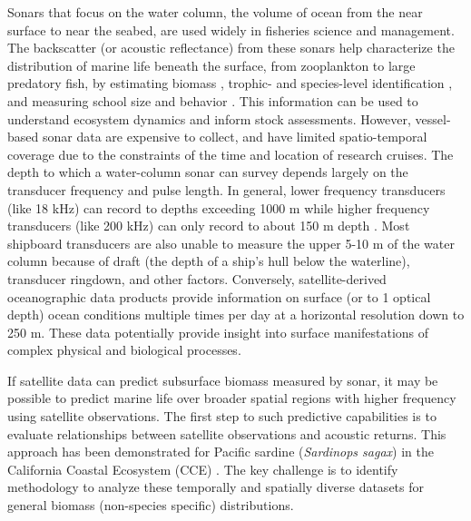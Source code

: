 \documentclass[10pt,letterpaper]{article}
\begin{document}
Sonars that focus on the water column, the volume of ocean from the near surface to near the seabed, are used widely in fisheries science and management. The backscatter (or acoustic reflectance) from these sonars help characterize the distribution of marine life beneath the surface, from zooplankton to large predatory fish, by estimating biomass \cite{davison2015acoustic}, trophic- and species-level identification \cite{benoit2001target} \cite{trenkel2013fisheries}, and measuring school size and behavior \cite{towler2003visualizing} \cite{kaartvedt2009use} \cite{jech2012aggregative}. This information can be used to understand ecosystem dynamics and inform stock assessments. However, vessel-based sonar data are expensive to collect, and have limited spatio-temporal coverage due to the constraints of the time and location of research cruises. The depth to which a water-column sonar can survey depends largely on the transducer frequency and pulse length. In general, lower frequency transducers (like 18 kHz) can record to depths exceeding 1000 m while higher frequency transducers (like 200 kHz) can only record to about 150 m depth \cite{simmonds2008fisheries}. Most shipboard transducers are also unable to measure the upper 5-10 m of the water column because of draft (the depth of a ship's hull below the waterline), transducer ringdown, and other factors. Conversely, satellite-derived oceanographic data products provide information on surface (or to 1 optical depth) ocean conditions multiple times per day at a horizontal resolution down to 250 m. These data potentially provide insight into surface manifestations of complex physical and biological processes.

If satellite data can predict subsurface biomass measured by sonar, it may be possible to predict marine life over broader spatial regions with higher frequency using satellite observations. The first step to such predictive capabilities is to evaluate relationships between satellite observations and acoustic returns. This approach has been demonstrated for Pacific sardine (\emph{Sardinops sagax}) in the California Coastal Ecosystem (CCE) \cite{zwolinski2011predicting}. The key challenge is to identify methodology to analyze these temporally and spatially diverse datasets for general biomass (non-species specific) distributions. 
\end{document}
